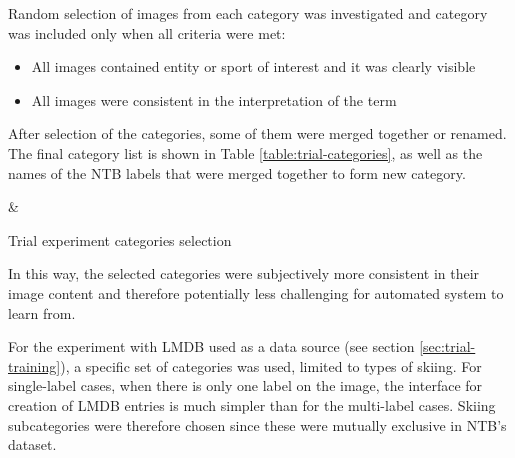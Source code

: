     Random selection of images from each category was investigated and category was included only when all criteria were met:
    \begin{itemize}
        \item All images contained entity or sport of interest and it was clearly visible
        \item All images were consistent in the interpretation of the term
    \end{itemize}
    
    After selection of the categories, some of them were merged together or renamed. The final category list is shown in Table \ref{table:trial-categories}, as well as the names of the NTB labels that were merged together to form new category.
    
    \begin{table}[H]
    \centering
    {}
    {\category & \ntbcategories}
    
    \caption{Trial experiment categories selection}
    \label{table:trial-categories}
    \end{table}
    
    In this way, the selected categories were subjectively more consistent in their image content and therefore potentially less challenging for automated system to learn from.
    
    For the experiment with LMDB \cite{lmdb} used as a data source (see section \ref{sec:trial-training}), a specific set of categories was used, limited to types of skiing. For single-label cases, when there is only one label on the image, the interface for creation of LMDB entries is much simpler than for the multi-label cases. Skiing subcategories were therefore chosen since these were mutually exclusive in NTB's dataset.
    

